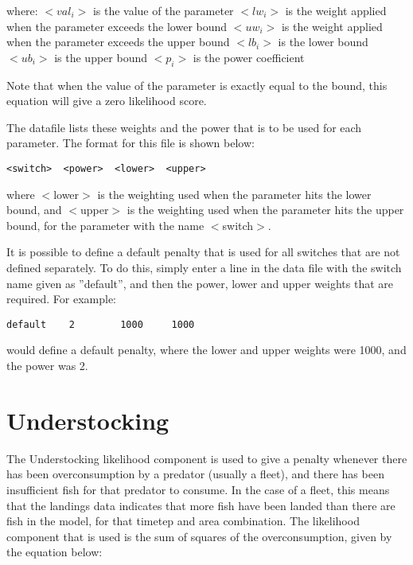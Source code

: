 \documentclass[10pt,twoside]{book}
\begin{document}
where:\newline
$<val_i>$ is the value of the parameter\newline
$<lw_i>$ is the weight applied when the parameter exceeds the lower bound\newline
$<uw_i>$ is the weight applied when the parameter exceeds the upper bound\newline
$<lb_i>$ is the lower bound\newline
$<ub_i>$ is the upper bound\newline
$<p_i>$ is the power coefficient\newline

Note that when the value of the parameter is exactly equal to the bound, this equation will give a zero likelihood score.

\bigskip
The datafile lists these weights and the power that is to be used for each parameter.  The format for this file is shown below:

{\small\begin{verbatim}
<switch>  <power>  <lower>  <upper>
\end{verbatim}}

where $<$lower$>$ is the weighting used when the parameter hits the lower bound, and $<$upper$>$ is the weighting used when the parameter hits the upper bound, for the parameter with the name $<$switch$>$.

\bigskip
It is possible to define a default penalty that is used for all switches that are not defined separately.  To do this, simply enter a line in the data file with the switch name given as ''default'', and then the power, lower and upper weights that are required.  For example:

{\small\begin{verbatim}
default    2        1000     1000
\end{verbatim}}

would define a default penalty, where the lower and upper weights were 1000, and the power was 2.

\section{Understocking}\label{sec:understocking}
The Understocking likelihood component is used to give a penalty whenever there has been overconsumption by a predator (usually a fleet), and there has been insufficient fish for that predator to consume.  In the case of a fleet, this means that the landings data indicates that more fish have been landed than there are fish in the model, for that timetep and area combination.  The likelihood component that is used is the sum of squares of the overconsumption, given by the equation below:
\end{document}
